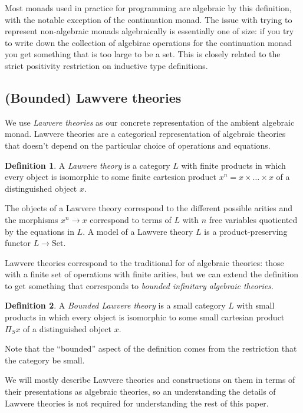 \documentclass[acmsmall, screen, nonacm]{acmart}
\theoremstyle{definition}
\newtheorem{definition}{Definition}[section]
\newcommand{\setc}{\mathrm{Set}}
\begin{document}
Most monads used in practice for programming are algebraic by this
definition, with the notable exception of the continuation monad. The
issue with trying to represent non-algebraic monads algebraically is
essentially one of size: if you try to write down the collection of
algebirac operations for the continuation monad you get something that
is too large to be a set. This is closely related to the strict
positivity restriction on inductive type definitions.

\subsection{(Bounded) Lawvere theories}

We use \emph{Lawvere theories} as our concrete representation of the
ambient algebraic monad. Lawvere theories are a categorical
representation of algebraic theories that doesn't depend on the
particular choice of operations and equations.

\begin{definition}
  A \emph{Lawvere theory} is a category $L$ with finite products in
  which every object is isomorphic to some finite cartesion product
  $x^n = x \times \ldots \times x$ of a distinguished object $x$.
\end{definition}
The objects of a Lawvere theory correspond to the different possible
arities and the morphisms $x^n \rightarrow x$ correspond to terms
of $L$ with $n$ free variables quotiented by the equations in $L$. A
model of a Lawvere theory $L$ is a product-preserving functor
$L \rightarrow \setc$.

Lawvere theories correspond to the traditional for of algebraic
theories: those with a finite set of operations with finite arities, but
we can extend the definition to get something that corresponds to
\emph{bounded infinitary algebraic theories}.
\begin{definition}
  A \emph{Bounded Lawvere theory} is a small category $L$ with small
  products in which every object is isomorphic to some small cartesian
  product $\Pi_S x$ of a distinguished object $x$.
\end{definition}
Note that the ``bounded'' aspect of the definition comes from the
restriction that the category be small.

We will mostly describe Lawvere theories and constructions on them in
terms of their presentations as algebraic theories, so an understanding
the details of Lawvere theories is not required for understanding the
rest of this paper.
\end{document}
